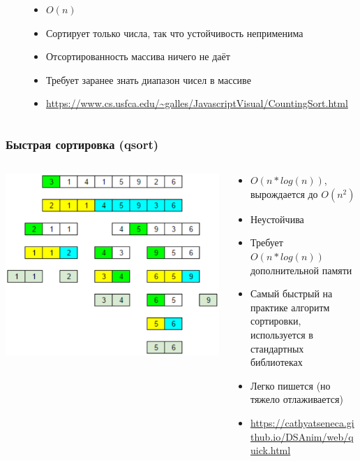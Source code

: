 \documentclass[xetex,mathserif,serif]{beamer}
\begin{document}
\begin{frame}
\begin{columns}
\begin{column}{0.2\textwidth}
			\end{column}
			\begin{column}{0.8\textwidth}
				\begin{itemize}
					\item $O(n)$
					\item Сортирует только числа, так что устойчивость неприменима
					\item Отсортированность массива ничего не даёт
					\item Требует заранее знать диапазон чисел в массиве
					\item \url{https://www.cs.usfca.edu/~galles/JavascriptVisual/CountingSort.html}
				\end{itemize}
			\end{column}
		\end{columns}
	\end{frame}

	\begin{frame}
		\frametitle{Быстрая сортировка (qsort)}
		\begin{columns}
			\begin{column}{0.5\textwidth}
				\includegraphics[width=\textwidth]{qsort.png}
			\end{column}
			\begin{column}{0.5\textwidth}
				\begin{itemize}
					\item $O(n * log(n))$, вырождается до $O(n^2)$
					\item Неустойчива
					\item Требует $O(n * log(n))$ дополнительной памяти
					\item Самый быстрый на практике алгоритм сортировки, используется в стандартных библиотеках
					\item Легко пишется (но тяжело отлаживается)
					\item \url{https://cathyatseneca.github.io/DSAnim/web/quick.html}
				\end{itemize}
			\end{column}
		\end{columns}
	\end{frame}
\end{document}
